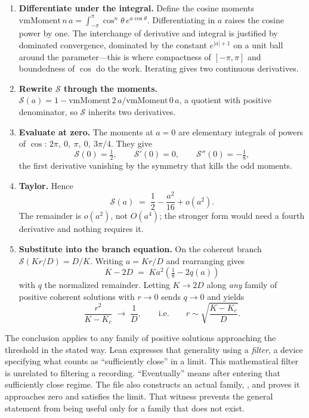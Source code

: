 \documentclass[11pt]{article}
\newcommand{\id}[1]{{\small\ttfamily\seqsplit{#1}}}
\newcommand{\Kc}{K_{c}}
\begin{document}
\begin{enumerate}[leftmargin=*]
\item \textbf{Differentiate under the integral.} Define the cosine moments
$\mathrm{vmMoment}\,n\,a=\int_{-\pi}^{\pi}\cos^n\!\theta\,e^{a\cos\theta}$.
Differentiating in $a$ raises the cosine power by one. The interchange of
derivative and integral is justified by dominated convergence, dominated by
the constant $e^{|a|+1}$ on a unit ball around the parameter---this is where
compactness of $[-\pi,\pi]$ and boundedness of $\cos$ do the work. Iterating
gives two continuous derivatives.
\item \textbf{Rewrite $\mathcal{S}$ through the moments.}
$\mathcal{S}(a)=1-\mathrm{vmMoment}\,2\,a/\mathrm{vmMoment}\,0\,a$, a quotient with
positive denominator, so $\mathcal{S}$ inherits two derivatives.
\item \textbf{Evaluate at zero.} The moments at $a=0$ are elementary integrals
of powers of $\cos$: $2\pi,\ 0,\ \pi,\ 0,\ 3\pi/4$. They give
\[
 \mathcal{S}(0)=\tfrac12,\qquad \mathcal{S}'(0)=0,\qquad \mathcal{S}''(0)=-\tfrac18 ,
\]
the first derivative vanishing by the symmetry that kills the odd moments.
\item \textbf{Taylor.} Hence
\[
 \mathcal{S}(a) \;=\; \frac12-\frac{a^2}{16}+o(a^2).
\]
The remainder is $o(a^2)$, not $O(a^4)$; the stronger form would need a fourth
derivative and nothing requires it.
\item \textbf{Substitute into the branch equation.} On the coherent branch
$\mathcal{S}(Kr/D)=D/K$. Writing $a=Kr/D$ and rearranging gives
\[
 K-2D \;=\; K a^2\!\left(\tfrac18-2q(a)\right)
\]
with $q$ the normalized remainder. Letting $K\to2D$ along \emph{any} family of
positive coherent solutions with $r\to0$ sends $q\to0$ and yields
\begin{equation}
 \frac{r^2}{K-\Kc}\;\longrightarrow\;\frac1D,
 \qquad\text{i.e.}\qquad
 r\sim\sqrt{\frac{K-\Kc}{D}} .
 \label{eq:onset}
\end{equation}
\end{enumerate}

\noindent
The conclusion applies to any family of positive solutions approaching the
threshold in the stated way. Lean expresses that generality using a
\emph{filter}, a device specifying what counts as ``sufficiently close'' in a
limit. This mathematical filter is unrelated to filtering a recording.
``Eventually'' means after entering that sufficiently close regime. The file
also constructs an actual family, \id{coherentBranch}, and proves it approaches
zero and satisfies the limit. That witness prevents the general statement from
being useful only for a family that does not exist.
\end{document}
